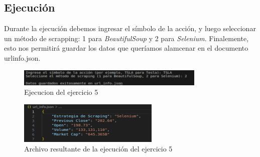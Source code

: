 \documentclass{article}
\begin{document}
\subsection{Ejecución}
Durante la ejecución debemos ingresar el símbolo de la acción, y luego seleccionar un método de scrapping: 1 para \textit{BeautifulSoup} y 
2 para \textit{Selenium}. Finalemente, esto nos permitirá guardar los datos que queríamos alamcenar en el documento url\textunderscore{}info.json.

\begin{figure}[h]
	\centering
        \vspace{15pt}
	\includegraphics[width=0.8\textwidth]{DS_ejecucion_ej5-1.png}
	\caption{Ejecucion del ejercicio 5}
	\label{fig:ej5}
\end{figure}

\newpage
\begin{figure}[h]
	\centering
        \vspace{15pt}
        \includegraphics[width=0.6\textwidth]{DS_ejecucion_ej5-2.png}
	\caption{Archivo resultante de la ejecución del ejercicio 5}
	\label{fig:archivo_ej5}
\end{figure}
\end{document}
